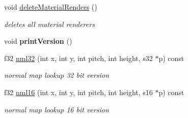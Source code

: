 \begin{DoxyCompactItemize}
\item 
\hypertarget{classirr_1_1video_1_1_c_null_driver_abe08e587864db4999fef23706fff1dfd}{void \hyperlink{classirr_1_1video_1_1_c_null_driver_abe08e587864db4999fef23706fff1dfd}{delete\-Material\-Renders} ()}\label{classirr_1_1video_1_1_c_null_driver_abe08e587864db4999fef23706fff1dfd}

\begin{DoxyCompactList}\small\item\em deletes all material renderers \end{DoxyCompactList}\item 
\hypertarget{classirr_1_1video_1_1_c_null_driver_a15562eb02b409fd60e75046bd0707da9}{void {\bfseries print\-Version} ()}\label{classirr_1_1video_1_1_c_null_driver_a15562eb02b409fd60e75046bd0707da9}

\item 
\hypertarget{classirr_1_1video_1_1_c_null_driver_a21885e1f8192035ec87d0ddb68dfe729}{f32 \hyperlink{classirr_1_1video_1_1_c_null_driver_a21885e1f8192035ec87d0ddb68dfe729}{nml32} (int x, int y, int pitch, int height, s32 $\ast$p) const }\label{classirr_1_1video_1_1_c_null_driver_a21885e1f8192035ec87d0ddb68dfe729}

\begin{DoxyCompactList}\small\item\em normal map lookup 32 bit version \end{DoxyCompactList}\item 
\hypertarget{classirr_1_1video_1_1_c_null_driver_aa25d50778d1a30d00c73ffd32a693cab}{f32 \hyperlink{classirr_1_1video_1_1_c_null_driver_aa25d50778d1a30d00c73ffd32a693cab}{nml16} (int x, int y, int pitch, int height, s16 $\ast$p) const }\label{classirr_1_1video_1_1_c_null_driver_aa25d50778d1a30d00c73ffd32a693cab}

\begin{DoxyCompactList}\small\item\em normal map lookup 16 bit version \end{DoxyCompactList}\end{DoxyCompactItemize}
